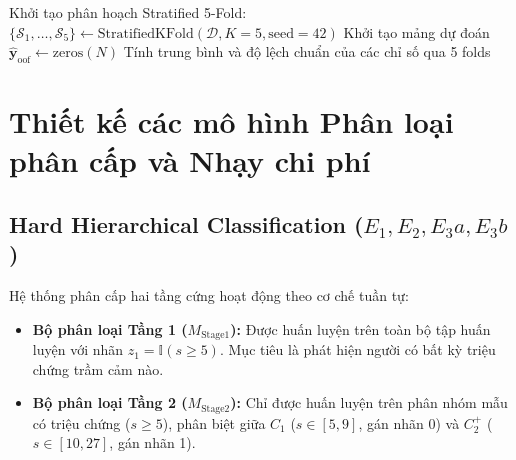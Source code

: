 \begin{algorithm}[h!]
\SetAlgoLined
{}
Khởi tạo phân hoạch Stratified 5-Fold: $\{\mathcal{S}_1, \dots, \mathcal{S}_5\} \leftarrow \text{StratifiedKFold}(\mathcal{D}, K=5, \text{seed}=42)$\;
Khởi tạo mảng dự đoán $\hat{\mathbf{y}}_{\text{oof}} \leftarrow \text{zeros}(N)$\;
Tính trung bình và độ lệch chuẩn của các chỉ số qua 5 folds\;
\;
\caption{Quy trình kiểm định chéo Stratified 5-Fold không rò rỉ dữ liệu trong DepSev-ML}
\label{algo:cv-leakage-free}
\end{algorithm}

\section{Thiết kế các mô hình Phân loại phân cấp và Nhạy chi phí}
\label{sec:thiet-ke-hierarchical}

\subsection{Hard Hierarchical Classification ($E_1, E_2, E_3a, E_3b$)}
Hệ thống phân cấp hai tầng cứng hoạt động theo cơ chế tuần tự:
\begin{itemize}
    \item \textbf{Bộ phân loại Tầng 1 ($M_{\text{Stage1}}$):} Được huấn luyện trên toàn bộ tập huấn luyện với nhãn $z_1 = \mathbb{I}(s \ge 5)$. Mục tiêu là phát hiện người có bất kỳ triệu chứng trầm cảm nào.
    \item \textbf{Bộ phân loại Tầng 2 ($M_{\text{Stage2}}$):} Chỉ được huấn luyện trên phân nhóm mẫu có triệu chứng ($s \ge 5$), phân biệt giữa $C_1$ ($s \in [5, 9]$, gán nhãn 0) và $C_2^+$ ($s \in [10, 27]$, gán nhãn 1).
\end{itemize}

